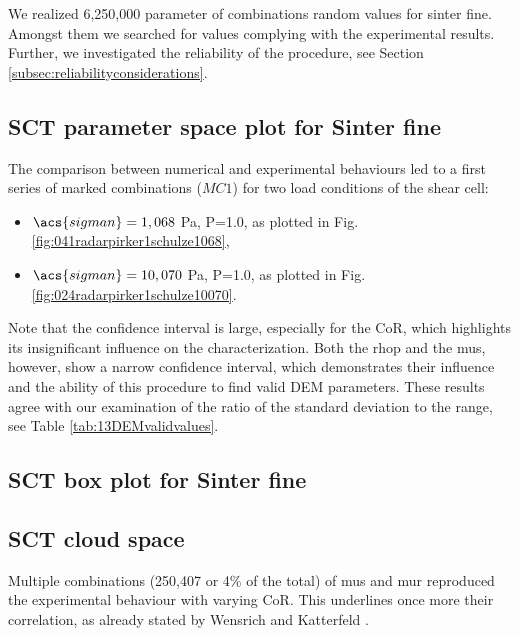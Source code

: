 We realized 6,250,000 parameter of combinations random values for sinter fine.
Amongst them we searched for values complying with the experimental results.
Further, we investigated the reliability of the procedure, see Section
\ref{subsec:reliabilityconsiderations}.

\subsection{SCT parameter space plot for Sinter fine}
\label{subsec:sctparameterspacesinterfine}



The comparison between numerical and experimental behaviours led to a first
series of marked combinations ($MC1$) for two load conditions of
the shear cell:
\begin{itemize}
  \item{$\acs{sigman} = 1,068$ Pa, P=1.0, as plotted in Fig.
  \ref{fig:041radarpirker1schulze1068},}
  \item{$\acs{sigman} = 10,070$ Pa, P=1.0, as plotted in Fig.
  \ref{fig:024radarpirker1schulze10070}.}
\end{itemize}
Note that the confidence interval is large, 
especially for the \acs{CoR}, which highlights its insignificant influence on the
characterization.
Both the \acs{rhop}  and the \acs{mus}, however, show a narrow confidence interval, 
which demonstrates their influence and the ability of this procedure to find
valid \acs{DEM} parameters.
These results agree with our examination of the ratio of the standard deviation
to the range, see Table \ref{tab:13DEMvalidvalues}.

\subsection{SCT box plot for Sinter fine}
\label{subsec:sctboxsinterfine}

\lipsum[1]



\subsection{SCT cloud space}
\label{subsec:sctcloudspace}

Multiple
combinations (250,407 or 4\% of the total) of \acs{mus} and \acs{mur} reproduced
the experimental behaviour with varying \acs{CoR}.
This underlines once more their correlation, as already stated by Wensrich and 
Katterfeld \cite{RefWorks:87}.

